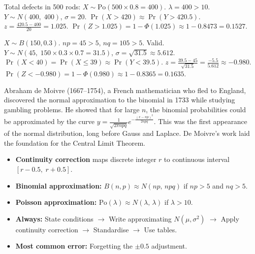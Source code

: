 \documentclass[11pt]{article}
\begin{document}
\begin{corrige}[Exercise 4]
Total defects in 500 rods: $X \sim \text{Po}(500 \times 0.8 = 400)$. $\lambda = 400 > 10$.
$Y \sim N(400,\; 400)$, $\sigma = 20$.
$\Pr(X > 420) \approx \Pr(Y > 420.5)$.
$z = \frac{420.5 - 400}{20} = 1.025$.
$\Pr(Z > 1.025) = 1 - \Phi(1.025) \approx 1 - 0.8473 = 0.1527$.
\end{corrige}

\begin{corrige}[Exercise 5]
$X \sim B(150, 0.3)$. $np = 45 > 5$, $nq = 105 > 5$. Valid.
$Y \sim N(45,\; 150 \times 0.3 \times 0.7 = 31.5)$, $\sigma = \sqrt{31.5} \approx 5.612$.
$\Pr(X < 40) = \Pr(X \le 39) \approx \Pr(Y < 39.5)$.
$z = \frac{39.5 - 45}{\sqrt{31.5}} = \frac{-5.5}{5.612} \approx -0.980$.
$\Pr(Z < -0.980) = 1 - \Phi(0.980) \approx 1 - 0.8365 = 0.1635$.
\end{corrige}

\begin{savaistu}
Abraham de Moivre (1667–1754), a French mathematician who fled to England, discovered the normal approximation to the binomial in 1733 while studying gambling problems. He showed that for large $n$, the binomial probabilities could be approximated by the curve $y = \frac{1}{\sqrt{2\pi npq}} e^{-\frac{(x-np)^2}{2npq}}$. This was the first appearance of the normal distribution, long before Gauss and Laplace. De Moivre's work laid the foundation for the Central Limit Theorem.
\end{savaistu}

\begin{aretenir}
\begin{itemize}
\item \textbf{Continuity correction} maps discrete integer $r$ to continuous interval $[r-0.5,\; r+0.5]$.
\item \textbf{Binomial approximation:} $B(n,p) \approx N(np,\,npq)$ if $np>5$ and $nq>5$.
\item \textbf{Poisson approximation:} $\text{Po}(\lambda) \approx N(\lambda,\,\lambda)$ if $\lambda>10$.
\item \textbf{Always:} State conditions $\to$ Write approximating $N(\mu,\sigma^2)$ $\to$ Apply continuity correction $\to$ Standardise $\to$ Use tables.
\item \textbf{Most common error:} Forgetting the $\pm 0.5$ adjustment.
\end{itemize}
\end{aretenir}
\end{document}
